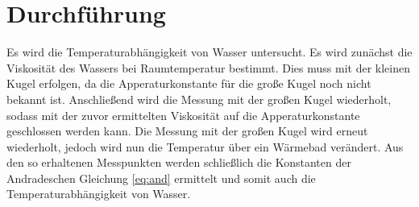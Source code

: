 \section{Durchführung}
\label{sec:Durchführung}
Es wird die Temperaturabhängigkeit von Wasser untersucht.
Es wird zunächst die Viskosität des Wassers bei Raumtemperatur bestimmt. Dies muss mit der kleinen Kugel erfolgen,
da die Apperaturkonstante für die große Kugel noch nicht bekannt ist. Anschließend wird die Messung mit der großen Kugel
wiederholt, sodass mit der zuvor ermittelten Viskosität auf die Apperaturkonstante geschlossen werden kann.
Die Messung mit der großen Kugel wird erneut wiederholt, jedoch wird nun die Temperatur über ein Wärmebad verändert.
Aus den so erhaltenen Messpunkten werden schließlich die Konstanten der Andradeschen Gleichung \eqref{eq:and} ermittelt 
und somit auch die Temperaturabhängigkeit von Wasser.
